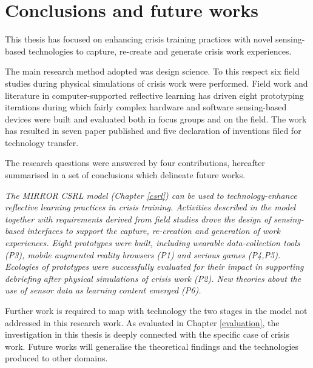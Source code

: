 \chapter{Conclusions and future works}\label{conclusions}


This thesis has focused on enhancing crisis training practices with novel sensing-based technologies to capture, re-create and generate crisis work experiences.

The main research method adopted was design science. To this respect six field studies during physical simulations of crisis work were performed. Field work and literature in computer-supported reflective learning has driven eight prototyping iterations during which fairly complex hardware and software sensing-based devices were built and evaluated both in focus groups and on the field. The work has resulted in seven paper published and five declaration of inventions filed for technology transfer.

The research questions were answered by four contributions, hereafter summarised in a set of conclusions which delineate future works. 
	
\begin{framed}
\emph{The MIRROR CSRL model (Chapter \ref{csrl}) can be used to technology-enhance reflective learning practices in crisis training. Activities described in the model together with requirements derived from field studies drove the design of sensing-based interfaces to support the capture, re-creation and generation of work experiences. Eight prototypes were built, including wearable data-collection tools (P3), mobile augmented reality browsers (P1) and serious games (P4,P5). Ecologies of prototypes were successfully evaluated for their impact in supporting debriefing after physical simulations of crisis work (P2). New theories about the use of sensor data as learning content emerged (P6).}
\par
Further work is required to map with technology the two stages in the model not addressed in this research work. As evaluated in Chapter \ref{evaluation}, the investigation in this thesis is deeply connected with the specific case of crisis work. Future works will generalise the theoretical findings and the technologies produced to other domains. 
\end{framed}

